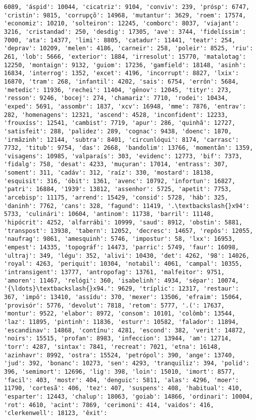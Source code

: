 \documentclass[11pt]{article}
\begin{document}
\begin{Verbatim}[commandchars=\\\{\}]
6089, 'áspid': 10044, 'cicatriz': 9104, 'conviv': 239, 'prósp': 6747, 'cristin': 9815, 'corrupçõ': 14968, 'mutantur': 3629, 'roem': 17574, 'economiz': 10210, 'solteiron': 12245, 'comborc': 8037, 'viajant': 3216, 'cristandad': 250, 'desdig': 17305, 'ave': 3744, 'fidelíssim': 7000, 'ata': 14377, 'limi': 8805, 'catadur': 11441, 'teatr': 254, 'deprav': 10209, 'melen': 4186, 'carneir': 258, 'poleir': 8525, 'riu': 261, 'lob': 5666, 'exterior': 1884, 'irresolut': 15770, 'matalotag': 12250, 'montaign': 9132, 'guiom': 17236, 'gamfield': 18148, 'asinh': 16834, 'interrog': 1352, 'excet': 4196, 'incorrupt': 8827, 'lxix': 16870, 'tram': 268, 'infantil': 4202, 'sais': 6754, 'errôn': 5684, 'metedic': 11936, 'rechei': 11404, 'gênov': 12045, 'tityr': 273, 'resson': 9246, 'bocej': 274, 'chamariz': 7710, 'rodei': 10434, 'exped': 5691, 'assombr': 1837, 'xcv': 16948, 'mme': 7876, 'entrav': 282, 'homenagens': 12321, 'ascend': 4528, 'inconfident': 12233, 'frouxíss': 12541, 'cambist': 7719, 'apur': 286, 'quinhã': 12727, 'satisfeit': 288, 'palidez': 289, 'cognac': 9438, 'doenc': 1870, 'irmãzinh': 12144, 'subtra': 8401, 'circunlóqui': 8174, 'carrasc': 7732, 'titub': 9754, 'das': 2668, 'bandolim': 13766, 'momentân': 1359, 'visagens': 10985, 'valparaís': 303, 'evidenc': 12773, 'bif': 7373, 'fidalg': 758, 'desat': 4233, 'muçuran': 17014, 'entrass': 307, 'soment': 311, 'cadáv': 312, 'raíz': 330, 'mostard': 18138, 'esquisit': 316, 'óbit': 1361, 'avenc': 10792, 'infortun': 16827, 'patri': 16884, '1939': 13812, 'assenhor': 5725, 'apetit': 7753, 'arcebisp': 11175, 'arrend': 15429, 'consid': 5728, 'háb': 325, 'daninh': 7762, 'cans': 328, 'fagund': 11419, '.\textbackslash{}x94': 5733, 'culinári': 10604, 'antinom': 11738, 'barril': 11148, 'hipócrit': 4252, 'alfarrábi': 10999, 'saud': 8912, 'obstin': 5881, 'transpost': 13938, 'tabern': 12052, 'decresc': 14657, 'repôs': 12055, 'naufrag': 9861, 'amesquinh': 5746, 'impostur': 58, 'lxx': 16953, 'empest': 14335, 'topográf': 14473, 'parric': 5749, 'faur': 16098, 'ultraj': 349, 'légu': 352, 'alivi': 10430, 'det': 4262, '98': 14026, 'royal': 4263, 'periquit': 10304, 'notabil': 4061, 'campal': 10355, 'intransigent': 13777, 'antropofag': 13761, 'malfeitor': 9751, 'amoren': 11467, 'relógi': 360, 'isabelinh': 4934, 'sépar': 10074, '{\ldots}\textbackslash{}x94.': 9629, 'tríplic': 12317, 'restaur': 367, 'impô': 13410, 'assídu': 370, 'mexer': 13506, 'efraim': 15064, 'provisór': 5776, 'devolut': 7818, 'retom': 5777, '.(': 17637, 'montur': 9522, 'elabor': 8972, 'consom': 10101, 'colômb': 13544, 'laz': 11895, 'pintinh': 11836, 'esturr': 10582, 'falador': 11894, 'escandinav': 14868, 'contínu': 4281, 'escond': 382, 'verit': 14872, 'noirs': 15515, 'profan': 8983, 'infeccion': 13944, 'am': 12714, 'torr': 4287, 'sintax': 7841, 'recreat': 7021, 'etna': 16148, 'azinhavr': 8992, 'ostra': 15524, 'petrópol': 390, 'ange': 13740, 'jud': 392, 'bonanc': 10273, 'sen': 4293, 'tranquiliz': 394, 'polid': 396, 'semimort': 12696, 'lig': 398, 'loin': 15010, 'imort': 8577, 'facil': 403, 'mostr': 404, 'denguic': 5811, 'alas': 4296, 'moer': 11790, 'cortesã': 406, 'tez': 407, 'suspens': 408, 'habitual': 410, 'esparter': 12443, 'chalup': 18063, 'goiab': 14866, 'ordinari': 10004, 'rot': 4610, 'acint': 7869, 'cerimoni': 414, 'vaidos': 416, 'clerkenwell': 18123, 'êxit': 
\end{Verbatim}
\end{document}
